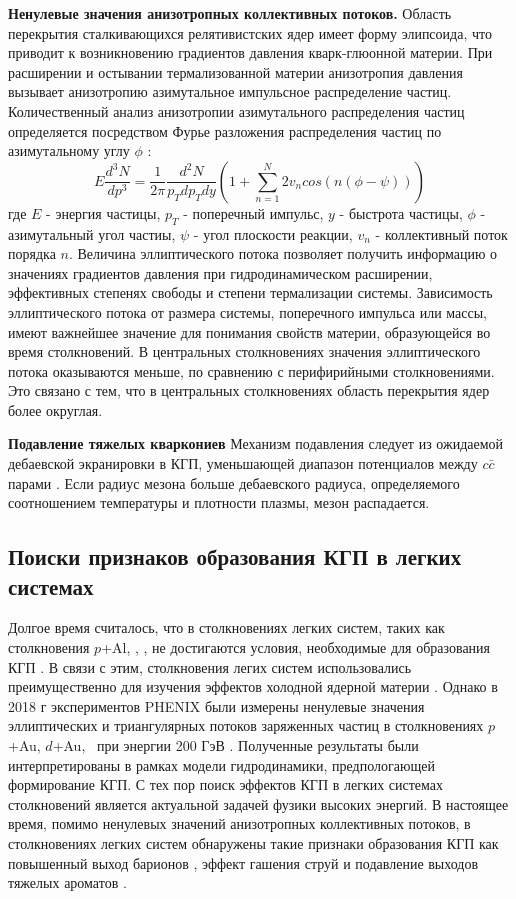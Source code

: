 \textbf{Ненулевые значения анизотропных коллективных потоков.}
Область перекрытия сталкивающихся релятивистских ядер имеет форму элипсоида, что приводит к возникновению градиентов давления кварк-глюонной материи. При расширении и остывании термализованной материи анизотропия давления вызывает анизотропию азимутальное импульсное распределение частиц. Количественный анализ анизотропии азимутального распределения частиц определяется посредством Фурье разложения распределения частиц по азимутальному углу $\phi$ \cite{QGP_signatures}:
$$ E \frac{d^3N}{dp^3} = \frac{1}{2\pi} \frac{d^2N}{p_T dp_T dy} 
(1+\sum_{n=1}^{N} 2v_n cos(n(\phi - \psi)))$$
где $E$ - энергия частицы, 
$p_T$ - поперечный импульс,
$y$ - быстрота частицы, 
$\phi$ - азимутальный угол частиы, 
$\psi$ - угол плоскости реакции, 
$v_n$ - коллективный поток порядка $n$. 
Величина эллиптического потока позволяет получить информацию о значениях градиентов давления при гидродинамическом расширении, эффективных степенях свободы и степени термализации системы. Зависимость эллиптического потока от размера системы, поперечного импульса или массы, имеют важнейшее значение для понимания свойств материи, образующейся во время столкновений. 
В центральных столкновениях значения эллиптического потока оказываются меньше, по сравнению с перифирийными столкновениями. Это связано с тем, что в центральных столкновениях область перекрытия ядер более округлая.

\textbf{Подавление тяжелых кваркониев}
Механизм подавления следует из ожидаемой дебаевской экранировки в КГП, уменьшающей диапазон потенциалов между $c\bar{c}$  парами \cite{QGP_signatures}. Если радиус мезона больше дебаевского радиуса, определяемого соотношением температуры и плотности плазмы, мезон распадается.


\subsection{Поиски признаков образования КГП в легких системах}
Долгое время считалось, что в столкновениях легких систем, таких как столкновения $p$+Al, \heau, \dau, не достигаются условия, необходимые для образования КГП \cite{CNM, QGP_small_syst}. В связи с этим, столкновения легих систем использовались преимущественно для изучения эффектов холодной ядерной материи \cite{phi_dAu}. 
Однако в 2018 г экспериментов PHENIX были измерены ненулевые значения эллиптических и триангулярных потоков заряженных частиц в столкновениях  $p$+Au, $d$+Au, \heau \ при энергии 200 ГэВ \cite{PHENIX_Nature}. Полученные результаты были интерпретированы в рамках модели гидродинамики, предпологающей формирование КГП. С тех пор поиск эффектов КГП в легких системах столкновений является актуальной задачей фузики высоких энергий. В настоящее время, помимо ненулевых значений анизотропных коллективных потоков, в столкновениях легких систем обнаружены такие признаки образования КГП как повышенный выход барионов \cite{ppg146}, эффект гашения струй \cite{pi0_smallSysts} и подавление выходов тяжелых ароматов \cite{psi_SmallSyst}. 

